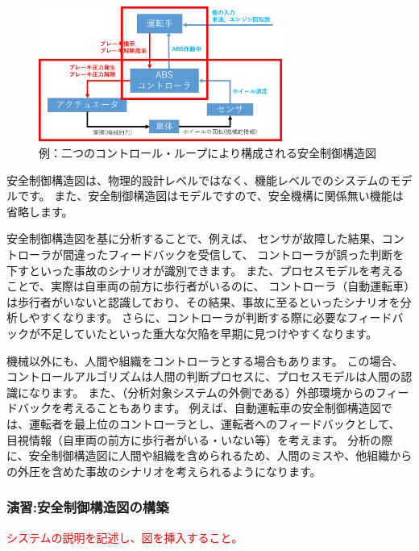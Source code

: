\begin{figure}[H]
    \centering
    \includegraphics[width=80mm]{safety_assurance_contents/ch3images/fig-3-2-3-02.png}
    \caption[short]{例：二つのコントロール・ループにより構成される安全制御構造図}
\end{figure}

安全制御構造図は、物理的設計レベルではなく、機能レベルでのシステムのモデルです。
また、安全制御構造図はモデルですので、安全機構に関係無い機能は省略します。

安全制御構造図を基に分析することで、例えば、
センサが故障した結果、コントローラが間違ったフィードバックを受信して、
コントローラが誤った判断を下すといった事故のシナリオが識別できます。
また、プロセスモデルを考えることで、実際は自車両の前方に歩行者がいるのに、
コントローラ（自動運転車）は歩行者がいないと認識しており、その結果、事故に至るといったシナリオを分析しやすくなります。
さらに、コントローラが判断する際に必要なフィードバックが不足していたといった重大な欠陥を早期に見つけやすくなります。

機械以外にも、人間や組織をコントローラとする場合もあります。
この場合、コントロールアルゴリズムは人間の判断プロセスに、プロセスモデルは人間の認識になります。
また、（分析対象システムの外側である）外部環境からのフィードバックを考えることもあります。
例えば、自動運転車の安全制御構造図では、運転者を最上位のコントローラとし、運転者へのフィードバックとして、
目視情報（自車両の前方に歩行者がいる・いない等）を考えます。
分析の際に、安全制御構造図に人間や組織を含められるため、人間のミスや、他組織からの外圧を含めた事故のシナリオを考えられるようになります。

\subsubsection{演習:安全制御構造図の構築} %

\textcolor{red}{システムの説明を記述し、図を挿入すること。}


